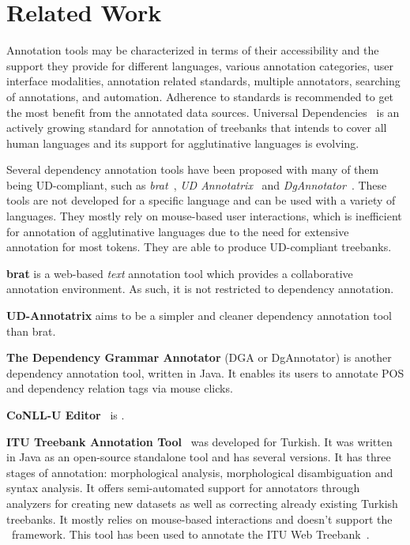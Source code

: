 \section{Related Work}
\label{sec:related}

Annotation tools may be characterized in terms of their accessibility and the support they provide for different languages, various annotation categories, user interface modalities, annotation related standards, multiple annotators, searching of annotations, and automation.
Adherence to standards is recommended to get the most benefit from the annotated data sources.
Universal Dependencies~\cite{UD} is an actively growing standard for annotation of treebanks that intends to cover all human languages and its support for agglutinative languages is evolving.

Several dependency annotation tools have been proposed with many of them being UD-compliant, such as \textit{brat}~\cite{brat}, \textit{UD Annotatrix}~\cite{ud-annotatrix} and \textit{DgAnnotator}~\cite{dgannotator}.
These tools are not developed for a specific language and can be used with a variety of languages.
They mostly rely on mouse-based user interactions, which is inefficient for annotation of agglutinative languages due to the need for extensive annotation for most tokens.
They are able to produce UD-compliant treebanks.

\textbf{brat} is a web-based \textit{text} annotation tool which provides a collaborative annotation environment. As such, it is not restricted to dependency annotation.

\textbf{UD-Annotatrix} aims to be a simpler and cleaner dependency annotation tool than brat.

\textbf{The Dependency Grammar Annotator} (DGA or DgAnnotator) is another dependency annotation tool, written in Java. It enables its users to annotate POS and dependency relation tags via mouse clicks.

\textbf{CoNLL-U Editor}~\cite{conll-u_editor} is .

\textbf{ITU Treebank Annotation Tool}~\cite{itu-annotation-tool} was developed for Turkish.
It was written in Java as an open-source standalone tool and has several versions.
It has three stages of annotation: morphological analysis, morphological disambiguation and syntax analysis.
It offers semi-automated support for annotators through analyzers for creating new datasets as well as correcting already existing Turkish treebanks.
It mostly relies on mouse-based interactions and doesn't support the \ud\ framework.
This tool has been used to annotate the ITU Web Treebank~\cite{itu-web-tb}.

